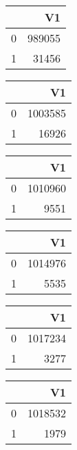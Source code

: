 \bigskip\bigskip
\centering
\begin{tabular}{rr}
  \hline
 & V1 \\ 
  \hline
0 & 989055 \\ 
  1 & 31456 \\ 
   \hline
\end{tabular}

\bigskip\bigskip
\centering
\begin{tabular}{rr}
  \hline
 & V1 \\ 
  \hline
0 & 1003585 \\ 
  1 & 16926 \\ 
   \hline
\end{tabular}

\bigskip\bigskip
\centering
\begin{tabular}{rr}
  \hline
 & V1 \\ 
  \hline
0 & 1010960 \\ 
  1 & 9551 \\ 
   \hline
\end{tabular}

\bigskip\bigskip
\centering
\begin{tabular}{rr}
  \hline
 & V1 \\ 
  \hline
0 & 1014976 \\ 
  1 & 5535 \\ 
   \hline
\end{tabular}

\bigskip\bigskip
\centering
\begin{tabular}{rr}
  \hline
 & V1 \\ 
  \hline
0 & 1017234 \\ 
  1 & 3277 \\ 
   \hline
\end{tabular}

\bigskip\bigskip
\centering
\begin{tabular}{rr}
  \hline
 & V1 \\ 
  \hline
0 & 1018532 \\ 
  1 & 1979 \\ 
   \hline
\end{tabular}

